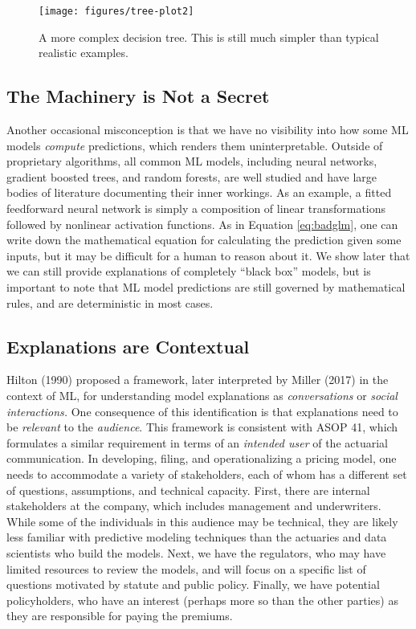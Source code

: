 \documentclass[preprint, 3p, twocolumn, letterpaper, 10pt]{elsarticle} %
\begin{document}
\begin{figure*}

{\centering \texttt{[image: figures/tree-plot2]} 

}

\caption{A more complex decision tree. This is still much simpler than typical realistic examples.}\label{fig:tree-plot2}
\end{figure*}

\hypertarget{the-machinery-is-not-a-secret}{%
\subsection{The Machinery is Not a Secret}\label{the-machinery-is-not-a-secret}}

Another occasional misconception is that we have no visibility into how some ML
models \emph{compute} predictions, which renders them uninterpretable. Outside of
proprietary algorithms, all common ML models, including neural networks,
gradient boosted trees, and random forests, are well studied and have large
bodies of literature documenting their inner workings. As an example, a fitted
feedforward neural network is simply a composition of linear transformations
followed by nonlinear activation functions. As in Equation \ref{eq:badglm}, one
can write down the mathematical equation for calculating the prediction given
some inputs, but it may be difficult for a human to reason about it. We show
later that we can still provide explanations of completely ``black box'' models,
but is important to note that ML model predictions are still governed by
mathematical rules, and are deterministic in most cases.

\hypertarget{explanations-are-contextual}{%
\subsection{Explanations are Contextual}\label{explanations-are-contextual}}

Hilton (1990) proposed a framework, later interpreted by
Miller (2017) in the context of ML, for understanding model explanations
as \emph{conversations} or \emph{social interactions.} One consequence of this identification
is that explanations need to be \emph{relevant} to the \emph{audience}. This framework is
consistent with ASOP 41, which formulates a similar requirement in terms of an
\emph{intended user} of the actuarial communication. In developing,
filing, and operationalizing a pricing model, one needs to accommodate a variety
of stakeholders, each of whom has a different set of questions, assumptions,
and technical capacity. First, there are internal stakeholders at the company,
which includes management and underwriters. While some of the individuals in
this audience may be technical, they are likely less familiar with predictive
modeling techniques than the actuaries and data scientists who build the models.
Next, we have the regulators, who may have limited resources to review the
models, and will focus on a specific list of questions motivated by statute
and public policy. Finally, we have potential policyholders, who have an interest (perhaps
more so than the other parties) as they are responsible for paying the premiums.
\end{document}
